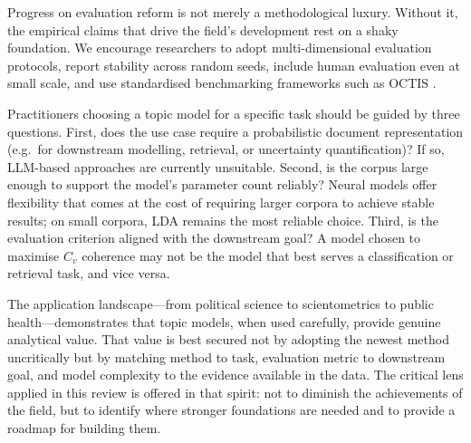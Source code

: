 \documentclass[11pt,a4paper]{article}
\begin{document}
Progress on evaluation reform is not merely a methodological luxury.
Without it, the empirical claims that drive the field's development
rest on a shaky foundation.
We encourage researchers to adopt multi-dimensional evaluation
protocols, report stability across random seeds, include human
evaluation even at small scale, and use standardised benchmarking
frameworks such as OCTIS \parencite{terragni2021octis}.

Practitioners choosing a topic model for a specific task should be
guided by three questions.
First, does the use case require a probabilistic document
representation (e.g.\ for downstream modelling, retrieval, or
uncertainty quantification)?
If so, LLM-based approaches are currently unsuitable.
Second, is the corpus large enough to support the model's parameter
count reliably?
Neural models offer flexibility that comes at the cost of requiring
larger corpora to achieve stable results; on small corpora, LDA
remains the most reliable choice.
Third, is the evaluation criterion aligned with the downstream goal?
A model chosen to maximise $C_{v}$ coherence may not be the model
that best serves a classification or retrieval task, and vice versa.

The application landscape---from political science
\parencite{bail2016combining} to scientometrics
\parencite{griffiths2004finding} to public health---demonstrates that
topic models, when used carefully, provide genuine analytical value.
That value is best secured not by adopting the newest method
uncritically but by matching method to task, evaluation metric to
downstream goal, and model complexity to the evidence available in
the data.
The critical lens applied in this review is offered in that spirit:
not to diminish the achievements of the field, but to identify where
stronger foundations are needed and to provide a roadmap for building
them.

\printbibliography
\end{document}
